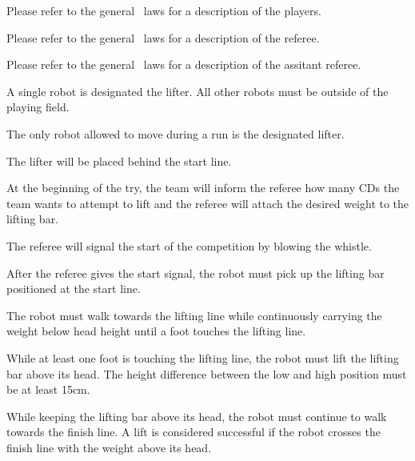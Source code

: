 \documentclass[12pt]{hurocup}
\begin{document}
Please refer to the general \HuroCup\ laws for a description of
the players.


Please refer to the general \HuroCup\ laws for a description of
the referee.


Please refer to the general \HuroCup\ laws for a description of
the assitant referee.


\begin{lawlist}[WL]

\item A single robot is designated the lifter. All other robots
  must be outside of the playing field.

\item The only robot allowed to move during a run is the
  designated lifter.

\item The lifter will be placed behind the start line.

\item At the beginning of the try, the team will inform the
 referee how many CDs the team wants to attempt to lift and the
 referee will attach the desired weight to the lifting bar.

\item The referee will signal the start of the competition by blowing
  the whistle.

\item After the referee gives the start signal, the robot must pick up
  the lifting bar positioned at the start line.

\item The robot must walk towards the lifting line while continuously
  carrying the weight below head height until a foot touches the
  lifting line.

\item While at least one foot is touching the lifting line, the robot
  must lift the lifting bar above its head. The height difference
  between the low and high position must be at least 15cm.

\item While keeping the lifting bar above its head, the robot must
 continue to walk towards the finish line. A lift is considered
 successful if the robot crosses the finish line with the weight above
 its head.


\end{lawlist}
\end{document}
